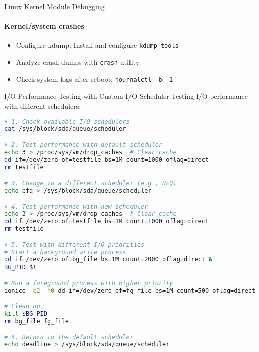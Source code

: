 \begin{KR}{Linux Kernel Module Debugging}
    \paragraph{Kernel/system crashes}
    \begin{itemize}
        \item Configure kdump: Install and configure \texttt{kdump-tools}
        \item Analyze crash dumps with \texttt{crash} utility
        \item Check system logs after reboot: \texttt{journalctl -b -1}
    \end{itemize}
\end{KR}

\begin{example2}{I/O Performance Testing with Custom I/O Scheduler}
    Testing I/O performance with different schedulers:
    
\begin{lstlisting}[language=bash, style=basesmol]
# 1. Check available I/O schedulers
cat /sys/block/sda/queue/scheduler

# 2. Test performance with default scheduler
echo 3 > /proc/sys/vm/drop_caches  # Clear cache
dd if=/dev/zero of=testfile bs=1M count=1000 oflag=direct
rm testfile

# 3. Change to a different scheduler (e.g., BFQ)
echo bfq > /sys/block/sda/queue/scheduler

# 4. Test performance with new scheduler
echo 3 > /proc/sys/vm/drop_caches  # Clear cache
dd if=/dev/zero of=testfile bs=1M count=1000 oflag=direct
rm testfile

# 5. Test with different I/O priorities
# Start a background write process
dd if=/dev/zero of=bg_file bs=1M count=2000 oflag=direct &
BG_PID=$!

# Run a foreground process with higher priority
ionice -c2 -n0 dd if=/dev/zero of=fg_file bs=1M count=500 oflag=direct

# Clean up
kill $BG_PID
rm bg_file fg_file

# 6. Return to the default scheduler
echo deadline > /sys/block/sda/queue/scheduler
\end{lstlisting}
\end{example2}
